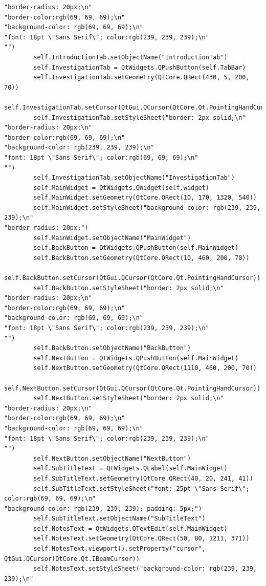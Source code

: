 \documentclass{article}
\begin{document}
\begin{lstlisting}
"border-radius: 20px;\n"
"border-color:rgb(69, 69, 69);\n"
"background-color: rgb(69, 69, 69);\n"
"font: 18pt \"Sans Serif\"; color:rgb(239, 239, 239);\n"
"")
        self.IntroductionTab.setObjectName("IntroductionTab")
        self.InvestigationTab = QtWidgets.QPushButton(self.TabBar)
        self.InvestigationTab.setGeometry(QtCore.QRect(430, 5, 200, 70))
        self.InvestigationTab.setCursor(QtGui.QCursor(QtCore.Qt.PointingHandCursor))
        self.InvestigationTab.setStyleSheet("border: 2px solid;\n"
"border-radius: 20px;\n"
"border-color:rgb(69, 69, 69);\n"
"background-color: rgb(239, 239, 239);\n"
"font: 18pt \"Sans Serif\"; color:rgb(69, 69, 69);\n"
"")
        self.InvestigationTab.setObjectName("InvestigationTab")
        self.MainWidget = QtWidgets.QWidget(self.widget)
        self.MainWidget.setGeometry(QtCore.QRect(10, 170, 1320, 540))
        self.MainWidget.setStyleSheet("background-color: rgb(239, 239, 239);\n"
"border-radius: 20px;")
        self.MainWidget.setObjectName("MainWidget")
        self.BackButton = QtWidgets.QPushButton(self.MainWidget)
        self.BackButton.setGeometry(QtCore.QRect(10, 460, 200, 70))
        self.BackButton.setCursor(QtGui.QCursor(QtCore.Qt.PointingHandCursor))
        self.BackButton.setStyleSheet("border: 2px solid;\n"
"border-radius: 20px;\n"
"border-color:rgb(69, 69, 69);\n"
"background-color: rgb(69, 69, 69);\n"
"font: 18pt \"Sans Serif\"; color:rgb(239, 239, 239);\n"
"")
        self.BackButton.setObjectName("BackButton")
        self.NextButton = QtWidgets.QPushButton(self.MainWidget)
        self.NextButton.setGeometry(QtCore.QRect(1110, 460, 200, 70))
        self.NextButton.setCursor(QtGui.QCursor(QtCore.Qt.PointingHandCursor))
        self.NextButton.setStyleSheet("border: 2px solid;\n"
"border-radius: 20px;\n"
"border-color:rgb(69, 69, 69);\n"
"background-color: rgb(69, 69, 69);\n"
"font: 18pt \"Sans Serif\"; color:rgb(239, 239, 239);\n"
"")
        self.NextButton.setObjectName("NextButton")
        self.SubTitleText = QtWidgets.QLabel(self.MainWidget)
        self.SubTitleText.setGeometry(QtCore.QRect(40, 20, 241, 41))
        self.SubTitleText.setStyleSheet("font: 25pt \"Sans Serif\"; color:rgb(69, 69, 69);\n"
"background-color: rgb(239, 239, 239); padding: 5px;")
        self.SubTitleText.setObjectName("SubTitleText")
        self.NotesText = QtWidgets.QTextEdit(self.MainWidget)
        self.NotesText.setGeometry(QtCore.QRect(50, 80, 1211, 371))
        self.NotesText.viewport().setProperty("cursor", QtGui.QCursor(QtCore.Qt.IBeamCursor))
        self.NotesText.setStyleSheet("background-color: rgb(239, 239, 239);\n"

\end{lstlisting}
\end{document}
